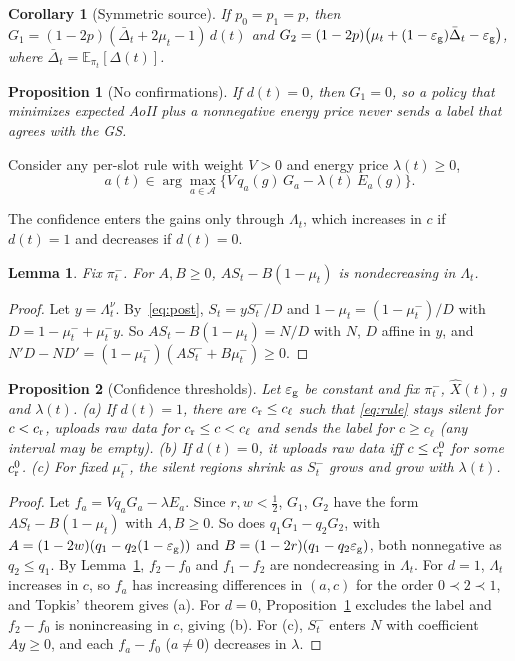 \documentclass[conference]{IEEEtran}
\newtheorem{lemma}{Lemma}
\newtheorem{proposition}{Proposition}
\newtheorem{corollary}{Corollary}
\theoremstyle{remark}
\newcommand{\E}{\mathbb{E}}
\newcommand{\A}{\mathcal{A}}
\newcommand{\lab}{\ell}
\newcommand{\Dbar}{\bar{\Delta}}
\newcommand{\ee}{\varepsilon}
\begin{document}
\begin{corollary}[Symmetric source]\label{cor:sym}
If $p_0=p_1=p$, then $G_1=(1-2p)(\Dbar_t+2\mu_t-1)\,d(t)$ and $G_2=(1-2p)\big(\mu_t+(1-\ee_{\rm g})\Dbar_t-\ee_{\rm g}\big)$, where $\Dbar_t=\E_{\pi_t}[\Delta(t)]$.
\end{corollary}

\begin{proposition}[No confirmations]\label{prop:confirm}
If $d(t)=0$, then $G_1=0$, so a policy that minimizes expected AoII plus a nonnegative energy price never sends a label that agrees with the GS.
\end{proposition}

Consider any per-slot rule with weight $V>0$ and energy price $\lambda(t)\ge0$,
\begin{equation}\label{eq:rule}
a(t)\in\arg\max_{a\in\A}\big\{V\,q_a(g)\,G_a-\lambda(t)\,E_a(g)\big\}.
\end{equation}

The confidence enters the gains only through $\Lambda_t$, which increases in $c$ if $d(t)=1$ and decreases if $d(t)=0$.

\begin{lemma}\label{lem:mono}
Fix $\pi^-_t$. For $A,B\ge0$, $AS_t-B(1-\mu_t)$ is nondecreasing in $\Lambda_t$.
\end{lemma}
\begin{proof}
Let $y=\Lambda_t^{\nu}$. By~\eqref{eq:post}, $S_t=yS^-_t/D$ and $1-\mu_t=(1-\mu^-_t)/D$ with $D=1-\mu^-_t+\mu^-_ty$. So $AS_t-B(1-\mu_t)=N/D$ with $N$, $D$ affine in $y$, and $N'D-ND'=(1-\mu^-_t)(AS^-_t+B\mu^-_t)\ge0$.
\end{proof}

\begin{proposition}[Confidence thresholds]\label{prop:threshold}
Let $\ee_{\rm g}$ be constant and fix $\pi^-_t$, $\hat X(t)$, $g$ and $\lambda(t)$. (a) If $d(t)=1$, there are $c_{\rm r}\le c_{\lab}$ such that \eqref{eq:rule} stays silent for $c<c_{\rm r}$, uploads raw data for $c_{\rm r}\le c<c_{\lab}$ and sends the label for $c\ge c_{\lab}$ (any interval may be empty). (b) If $d(t)=0$, it uploads raw data iff $c\le c^0_{\rm r}$ for some $c^0_{\rm r}$. (c) For fixed $\mu^-_t$, the silent regions shrink as $S^-_t$ grows and grow with $\lambda(t)$.
\end{proposition}
\begin{proof}
Let $f_a=Vq_aG_a-\lambda E_a$. Since $r,w<\tfrac12$, $G_1$, $G_2$ have the form $AS_t-B(1-\mu_t)$ with $A,B\ge0$. So does $q_1G_1-q_2G_2$, with $A=(1-2w)(q_1-q_2(1-\ee_{\rm g}))$ and $B=(1-2r)(q_1-q_2\ee_{\rm g})$, both nonnegative as $q_2\le q_1$. By Lemma~\ref{lem:mono}, $f_2-f_0$ and $f_1-f_2$ are nondecreasing in $\Lambda_t$. For $d=1$, $\Lambda_t$ increases in $c$, so $f_a$ has increasing differences in $(a,c)$ for the order $0\prec2\prec1$, and Topkis' theorem gives (a). For $d=0$, Proposition~\ref{prop:confirm} excludes the label and $f_2-f_0$ is nonincreasing in $c$, giving (b). For (c), $S^-_t$ enters $N$ with coefficient $Ay\ge0$, and each $f_a-f_0$ ($a\neq0$) decreases in $\lambda$.
\end{proof}
\end{document}
